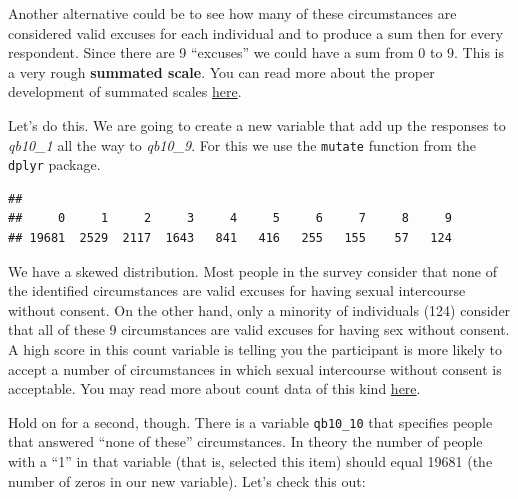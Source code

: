 \documentclass[
]{book}
\newenvironment{Shaded}{\begin{snugshade}}{\end{snugshade}}
\newcommand{\AttributeTok}[1]{\textcolor[rgb]{0.77,0.63,0.00}{#1}}
\newcommand{\FunctionTok}[1]{\textcolor[rgb]{0.00,0.00,0.00}{#1}}
\newcommand{\NormalTok}[1]{#1}
\newcommand{\OtherTok}[1]{\textcolor[rgb]{0.56,0.35,0.01}{#1}}
\newcommand{\SpecialCharTok}[1]{\textcolor[rgb]{0.00,0.00,0.00}{#1}}
\begin{document}
Another alternative could be to see how many of these circumstances are considered valid excuses for each individual and to produce a sum then for every respondent. Since there are 9 ``excuses'' we could have a sum from 0 to 9. This is a very rough \textbf{summated scale}. You can read more about the proper development of summated scales \href{https://pdfs.semanticscholar.org/aa84/dc485a07b920a957e9ef295e8dced8fa025c.pdf}{here}.

Let's do this. We are going to create a new variable that add up the responses to \emph{qb10\_1} all the way to \emph{qb10\_9}. For this we use the \texttt{mutate} function from the \texttt{dplyr} package.

\begin{Shaded}
\end{Shaded}

\begin{verbatim}
## 
##     0     1     2     3     4     5     6     7     8     9 
## 19681  2529  2117  1643   841   416   255   155    57   124
\end{verbatim}

We have a skewed distribution. Most people in the survey consider that none of the identified circumstances are valid excuses for having sexual intercourse without consent. On the other hand, only a minority of individuals (124) consider that all of these 9 circumstances are valid excuses for having sex without consent. A high score in this count variable is telling you the participant is more likely to accept a number of circumstances in which sexual intercourse without consent is acceptable. You may read more about count data of this kind \href{https://en.wikipedia.org/wiki/Count_data}{here}.

Hold on for a second, though. There is a variable \texttt{qb10\_10} that specifies people that answered ``none of these'' circumstances. In theory the number of people with a ``1'' in that variable (that is, selected this item) should equal 19681 (the number of zeros in our new variable). Let's check this out:
\end{document}
